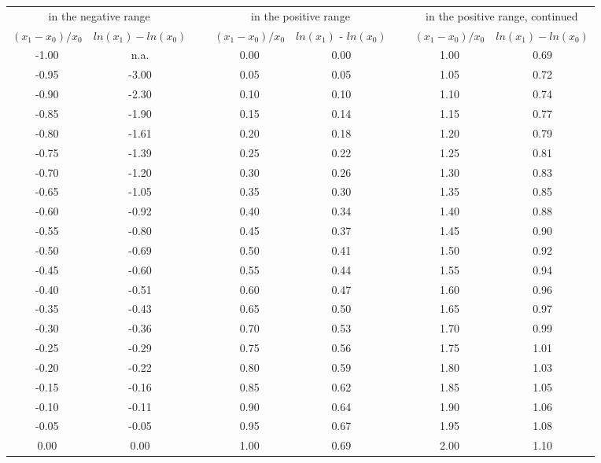 
    \begin{tabular}{cccccccc}
    \toprule
    \multicolumn{2}{c}{in the negative range} &       & \multicolumn{2}{c}{in the positive range} &       & \multicolumn{2}{c}{in the positive range, continued} \\
    $(x_1 - x_0)/x_0$ & $ln(x_1) - ln(x_0)$ &       & $(x_1 - x_0)/x_0$ & $ln(x_1)$ - $ln(x_0)$ &       & $(x_1 - x_0)/x_0$ & $ln(x_1) - ln(x_0)$ \\
    \toprule
    -1.00 & n.a.  &       & 0.00  & 0.00  &       & 1.00  & 0.69 \\ \hline
    -0.95 & -3.00 &       & 0.05  & 0.05  &       & 1.05  & 0.72 \\ \hline
    -0.90 & -2.30 &       & 0.10  & 0.10  &       & 1.10  & 0.74 \\ \hline
    -0.85 & -1.90 &       & 0.15  & 0.14  &       & 1.15  & 0.77 \\ \hline
    -0.80 & -1.61 &       & 0.20  & 0.18  &       & 1.20  & 0.79 \\ \hline
    -0.75 & -1.39 &       & 0.25  & 0.22  &       & 1.25  & 0.81 \\ \hline
    -0.70 & -1.20 &       & 0.30  & 0.26  &       & 1.30  & 0.83 \\ \hline
    -0.65 & -1.05 &       & 0.35  & 0.30  &       & 1.35  & 0.85 \\ \hline
    -0.60 & -0.92 &       & 0.40  & 0.34  &       & 1.40  & 0.88 \\ \hline
    -0.55 & -0.80 &       & 0.45  & 0.37  &       & 1.45  & 0.90 \\ \hline
    -0.50 & -0.69 &       & 0.50  & 0.41  &       & 1.50  & 0.92 \\ \hline
    -0.45 & -0.60 &       & 0.55  & 0.44  &       & 1.55  & 0.94 \\ \hline
    -0.40 & -0.51 &       & 0.60  & 0.47  &       & 1.60  & 0.96 \\ \hline
    -0.35 & -0.43 &       & 0.65  & 0.50  &       & 1.65  & 0.97 \\ \hline
    -0.30 & -0.36 &       & 0.70  & 0.53  &       & 1.70  & 0.99 \\ \hline
    -0.25 & -0.29 &       & 0.75  & 0.56  &       & 1.75  & 1.01 \\ \hline
    -0.20 & -0.22 &       & 0.80  & 0.59  &       & 1.80  & 1.03 \\ \hline
    -0.15 & -0.16 &       & 0.85  & 0.62  &       & 1.85  & 1.05 \\ \hline
    -0.10 & -0.11 &       & 0.90  & 0.64  &       & 1.90  & 1.06 \\ \hline
    -0.05 & -0.05 &       & 0.95  & 0.67  &       & 1.95  & 1.08 \\ \hline
    0.00  & 0.00  &       & 1.00  & 0.69  &       & 2.00  & 1.10 \\ 
    \bottomrule
    \end{tabular}%
